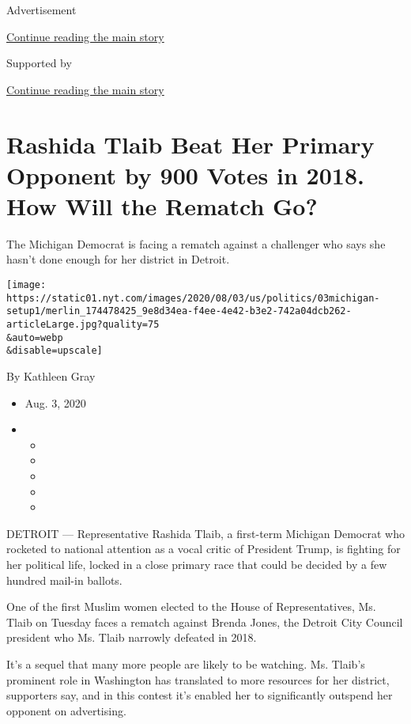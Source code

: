 Advertisement

\protect\hyperlink{after-top}{Continue reading the main story}

Supported by

\protect\hyperlink{after-sponsor}{Continue reading the main story}

\hypertarget{rashida-tlaib-beat-her-primary-opponent-by-900-votes-in-2018-how-will-the-rematch-go}{%
\section{Rashida Tlaib Beat Her Primary Opponent by 900 Votes in 2018.
How Will the Rematch
Go?}\label{rashida-tlaib-beat-her-primary-opponent-by-900-votes-in-2018-how-will-the-rematch-go}}

The Michigan Democrat is facing a rematch against a challenger who says
she hasn't done enough for her district in Detroit.

\texttt{[image: https://static01.nyt.com/images/2020/08/03/us/politics/03michigan-setup1/merlin\_174478425\_9e8d34ea-f4ee-4e42-b3e2-742a04dcb262-articleLarge.jpg?quality=75\\\&auto=webp\\\&disable=upscale]}

By Kathleen Gray

\begin{itemize}
\item
  Aug. 3, 2020
\item
  \begin{itemize}
  \item
  \item
  \item
  \item
  \item
  \end{itemize}
\end{itemize}

DETROIT --- Representative Rashida Tlaib, a first-term Michigan Democrat
who rocketed to national attention as a vocal critic of President Trump,
is fighting for her political life, locked in a close primary race that
could be decided by a few hundred mail-in ballots.

One of the first Muslim women elected to the House of Representatives,
Ms. Tlaib on Tuesday faces a rematch against Brenda Jones, the Detroit
City Council president who Ms. Tlaib narrowly defeated in 2018.

It's a sequel that many more people are likely to be watching. Ms.
Tlaib's prominent role in Washington has translated to more resources
for her district, supporters say, and in this contest it's enabled her
to significantly outspend her opponent on advertising.


